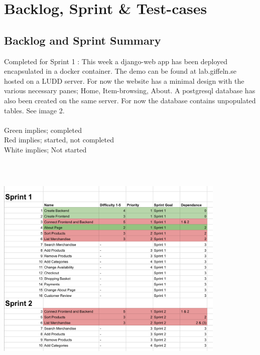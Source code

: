 \newpage
\section{Backlog, Sprint \& Test-cases}

\subsection{Backlog and Sprint Summary}
Completed for Sprint 1 :
This week a django-web app has been deployed encapsulated in a docker container. The demo can be found at lab.giffeln.se hosted on a LUDD server. For now the website has a minimal design with the various necessary panes; Home, Item-browsing, About. A postgresql database has also been created on the same server. For now the database contains unpopulated tables. See image 2. 
\\
\\
Green implies; completed
\\
Red implies; started, not completed 
\\  
White implies; Not started
\\
\includegraphics[height=12cm, width=11cm]{sprint1.png}

\newpage
